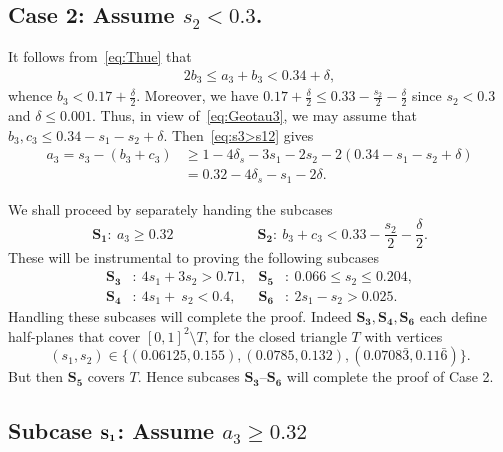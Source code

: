 \subsection*{Case 2: Assume $s_2< 0.3$.}

It follows from~\eqref{eq:Thue} that
\begin{align}\label{eq:2b3}
2b_3 \le a_3 + b_3 < 0.34+\delta,
\end{align} whence $b_3 < 0.17+\frac{\delta}{2}$. Moreover, we have $0.17+\frac{\delta}{2} \leq
0.33-\frac{s_2}{2}-\frac{\delta}{2}$ since $s_2<0.3$ and $\delta\leq 0.001$. Thus, in view of~\eqref{eq:Geotau3}, we may assume that $b_3,c_3 \leq 0.34-s_1-s_2+ \delta$.
Then~\eqref{eq:s3>s12} gives
\begin{align}
\label{eq:a_3>0.3-s_1}
a_3 = s_3 - (b_3+c_3)
&\ge 1-4\delta_s - 3s_1 - 2s_2 - 2(0.34 - s_1 - s_2+\delta) \nonumber\\
&= 0.32-4\delta_s -s_1-2\delta.
\end{align}


We shall proceed by separately handing the subcases
\[
\mathbf{S_1}:\ a_3\geq 0.32 \qquad\qquad\qquad \mathbf{S_2}: \
b_3+c_3<0.33-\frac{s_2}{2}-\frac{\delta}{2}.
 \]
These will be instrumental to proving the following subcases
\begin{align*}
\mathbf{S_3}&:\ 4s_1+3s_2 > 0.71, & \mathbf{S_5}&:\
0.066\leq s_2\leq
0.204,\\
\mathbf{S_4}&:\ 4s_1+\ s_2 <0.4 ,
 & \mathbf{S_6}&:\
2s_1-s_2>0.025.
\end{align*}
Handling these subcases will complete the proof.
Indeed $\mathbf{S_3}, \mathbf{S_4}, \mathbf{S_6}$
each define half-planes that cover $[0,1]^2\setminus T$, for the closed triangle $T$ with vertices
\[
(s_1,s_2)\in \{(0.06125,0.155), (0.0785,0.132), (
0.0708\bar3,
0.11\bar 6)\}.
\]
But then
$\mathbf{S_5}$ covers $T$. Hence subcases $\mathbf{S_3}$--$\mathbf{S_6}$ will complete the proof of Case 2.

\subsection*{Subcase $\bf{S_1}$: Assume $a_3\geq 0.32$}

